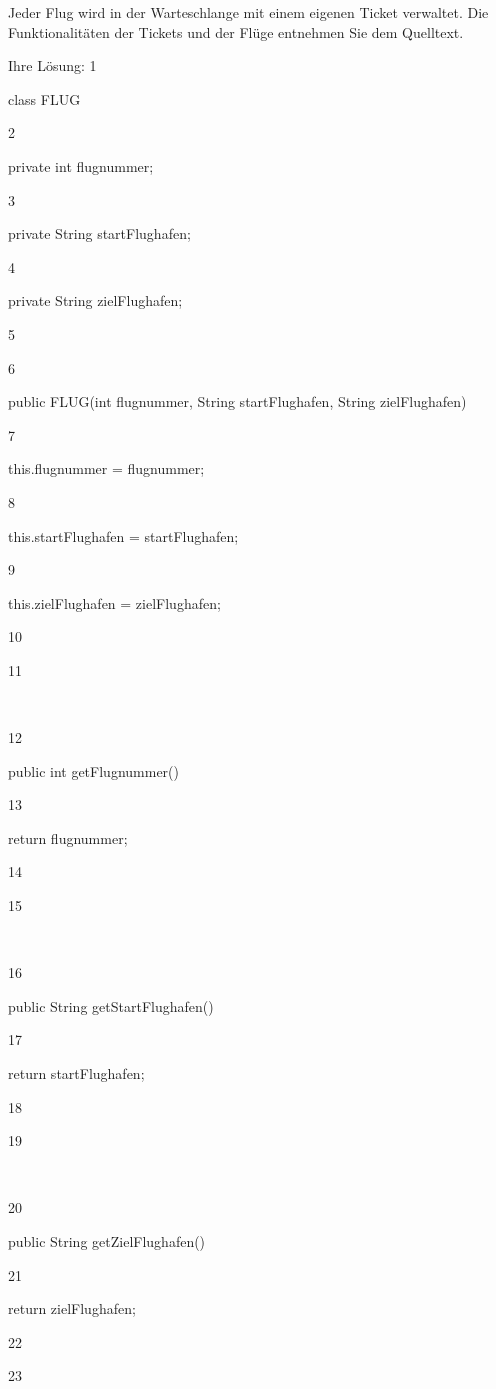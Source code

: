 \documentclass{lehramt-informatik}
\begin{document}
{Jeder Flug wird in der Warteschlange mit einem eigenen Ticket verwaltet. Die Funktionalitäten der Tickets und der Flüge entnehmen Sie dem Quelltext.

Ihre Lösung:
1

class FLUG {

2

    private int flugnummer;

3

    private String startFlughafen;

4

    private String zielFlughafen;

5

6

    public FLUG(int flugnummer, String startFlughafen, String zielFlughafen) {

7

        this.flugnummer = flugnummer;

8

        this.startFlughafen = startFlughafen;

9

        this.zielFlughafen = zielFlughafen;

10

    }

11

​

12

    public int getFlugnummer() {

13

        return flugnummer;

14

    }

15

​

16

    public String getStartFlughafen() {

17

        return startFlughafen;

18

    }

19

​

20

    public String getZielFlughafen() {

21

        return zielFlughafen;

22

    }

23

}}
\end{document}
